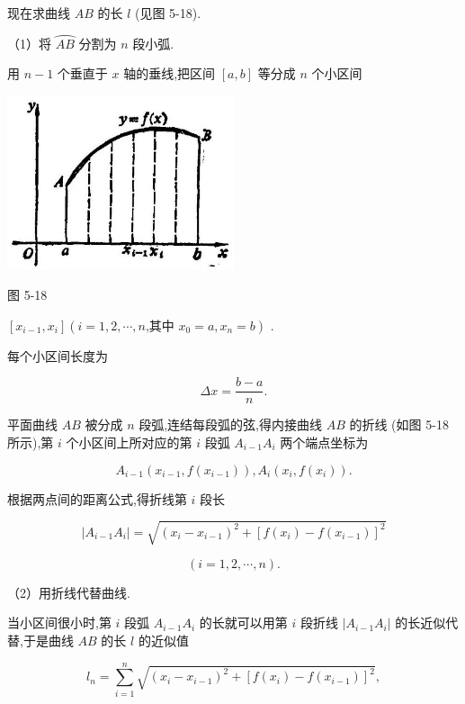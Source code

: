 \documentclass[lang=cn,newtx,12pt,scheme=chinese]{elegantbook}
\begin{document}
现在求曲线 \({AB}\) 的长 \(l\) (见图 5-18).

（1）将 \(\overset{⏜}{AB}\) 分割为 \(n\) 段小弧.

用 \(n - 1\) 个垂直于 \(x\) 轴的垂线,把区间 \(\left\lbrack {a,b}\right\rbrack\) 等分成 \(n\) 个小区间

\begin{center}
\includegraphics[max width=0.5\textwidth]{images/01912c18-5c3f-733d-b775-749ba9897a9d_240_926911.jpg}
\end{center}

图 5-18

\(\left\lbrack {{x}_{i - 1},{x}_{i}}\right\rbrack \left( {i = 1,2,\cdots ,n\text{,其中 }{x}_{0} = a,{x}_{n} = b}\right)\) .

每个小区间长度为

\[
{\Delta x} = \frac{b - a}{n}.
\]

平面曲线 \({AB}\) 被分成 \(n\) 段弧,连结每段弧的弦,得内接曲线 \({AB}\) 的折线 (如图 5-18 所示),第 \(i\) 个小区间上所对应的第 \(i\) 段弧 \({A}_{i - 1}{A}_{i}\) 两个端点坐标为

\[
{A}_{i - 1}\left( {{x}_{i - 1},f\left( {x}_{i - 1}\right) }\right) ,{A}_{i}\left( {{x}_{i},f\left( {x}_{i}\right) }\right) .
\]

根据两点间的距离公式,得折线第 \(i\) 段长

\[
\left| {{A}_{i - 1}{A}_{i}}\right| = \sqrt{{\left( {x}_{i} - {x}_{i - 1}\right) }^{2} + {\left\lbrack f\left( {x}_{i}\right) - f\left( {x}_{i - 1}\right) \right\rbrack }^{2}}
\]

\[
\left( {i = 1,2,\cdots ,n}\right) \text{.}
\]

（2）用折线代替曲线.

当小区间很小时,第 \(i\) 段弧 \({A}_{i - 1}{A}_{i}\) 的长就可以用第 \(i\) 段折线 \(\left| {{A}_{i - 1}{A}_{i}}\right|\) 的长近似代替,于是曲线 \({AB}\) 的长 \(l\) 的近似值

\[
{l}_{n} = \mathop{\sum }\limits_{{i = 1}}^{n}\sqrt{{\left( {x}_{i} - {x}_{i - 1}\right) }^{2} + {\left\lbrack f\left( {x}_{i}\right) - f\left( {x}_{i - 1}\right) \right\rbrack }^{2}}, \tag{1}
\]
\end{document}
